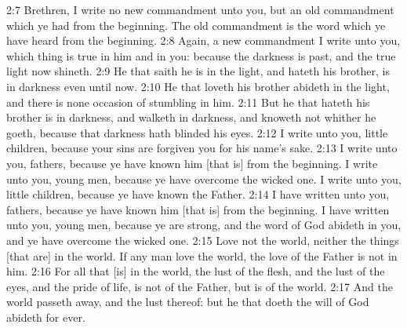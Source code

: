    {2:7} Brethren, I write no new commandment unto you, but an old
commandment which ye had from the beginning. The old commandment is the
word which ye have heard from the beginning. {2:8} Again, a new
commandment I write unto you, which thing is true in him and in you:
because the darkness is past, and the true light now shineth. {2:9} He
that saith he is in the light, and hateth his brother, is in darkness
even until now. {2:10} He that loveth his brother abideth in the light,
and there is none occasion of stumbling in him. {2:11} But he that
hateth his brother is in darkness, and walketh in darkness, and knoweth
not whither he goeth, because that darkness hath blinded his eyes.
{2:12} I write unto you, little children, because your sins are
forgiven you for his name's sake. {2:13} I write unto you, fathers,
because ye have known him [that is] from the beginning. I write unto
you, young men, because ye have overcome the wicked one. I write unto
you, little children, because ye have known the Father. {2:14} I have
written unto you, fathers, because ye have known him [that is] from the
beginning. I have written unto you, young men, because ye are strong,
and the word of God abideth in you, and ye have overcome the wicked
one. {2:15} Love not the world, neither the things [that are] in the
world. If any man love the world, the love of the Father is not in him.
{2:16} For all that [is] in the world, the lust of the flesh, and the
lust of the eyes, and the pride of life, is not of the Father, but is
of the world. {2:17} And the world passeth away, and the lust thereof:
but he that doeth the will of God abideth for ever.

